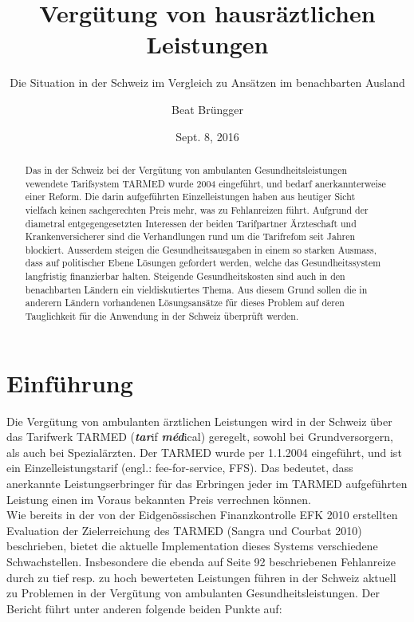 \documentclass[ngerman,a4paper]{article}
\title{Vergütung von hausräztlichen Leistungen}
\subtitle{Die Situation in der Schweiz im Vergleich zu Ansätzen im benachbarten
Ausland}
\author{Beat Brüngger}
\date{Sept. 8, 2016}
\begin{document}
\maketitle
\begin{abstract}
Das in der Schweiz bei der Vergütung von ambulanten
Gesundheitsleistungen vewendete Tarifsystem TARMED wurde 2004
eingeführt, und bedarf anerkannterweise einer Reform. Die darin
aufgeführten Einzelleistungen haben aus heutiger Sicht vielfach keinen
sachgerechten Preis mehr, was zu Fehlanreizen führt. Aufgrund der
diametral entgegengesetzten Interessen der beiden Tarifpartner
Ärzteschaft und Krankenversicherer sind die Verhandlungen rund um die
Tarifrefom seit Jahren blockiert. Ausserdem steigen die
Gesundheitsausgaben in einem so starken Ausmass, dass auf politischer
Ebene Lösungen gefordert werden, welche das Gesundheitssystem
langfristig finanzierbar halten. Steigende Gesundheitskosten sind auch
in den benachbarten Ländern ein vieldiskutiertes Thema. Aus diesem Grund
sollen die in anderern Ländern vorhandenen Lösungsansätze für dieses
Problem auf deren Tauglichkeit für die Anwendung in der Schweiz
überprüft werden.
\end{abstract}


\newpage

{
\setcounter{tocdepth}{2}
\tableofcontents
}
\pagebreak

\section{Einführung}\label{einfuhrung}

Die Vergütung von ambulanten ärztlichen Leistungen wird in der Schweiz
über das Tarifwerk TARMED (\textbf{\emph{tar}}if
\textbf{\emph{méd}}ical) geregelt, sowohl bei Grundversorgern, als auch
bei Spezialärzten. Der TARMED wurde per 1.1.2004 eingeführt, und ist ein
Einzelleistungstarif (engl.: fee-for-service, FFS). Das bedeutet, dass
anerkannte Leistungserbringer für das Erbringen jeder im TARMED
aufgeführten Leistung einen im Voraus bekannten Preis verrechnen
können.\\
Wie bereits in der von der Eidgenössischen Finanzkontrolle EFK 2010
erstellten Evaluation der Zielerreichung des TARMED (Sangra und Courbat
2010) beschrieben, bietet die aktuelle Implementation dieses Systems
verschiedene Schwachstellen. Insbesondere die ebenda auf Seite 92
beschriebenen Fehlanreize durch zu tief resp. zu hoch bewerteten
Leistungen führen in der Schweiz aktuell zu Problemen in der Vergütung
von ambulanten Gesundheitsleistungen. Der Bericht führt unter anderen
folgende beiden Punkte auf:
\end{document}
